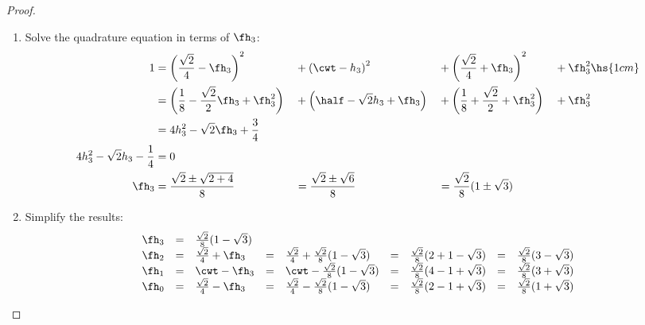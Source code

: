 \begin{proof}
\begin{enumerate}
    \item Solve the quadrature equation in terms of $\fh_3$:
      \begin{align*}
        1
          &=  \left(\frac{\sqrt{2}}{4}-\fh_3\right)^2
          &&+ \left(\cwt-h_3\right)^2
          &&+ \left(\frac{\sqrt{2}}{4}+\fh_3\right)^2
          &&+\fh_3^2 \hs{1cm}
        \\&=  \left(\frac{1}{8}-\frac{\sqrt{2}}{2}\fh_3 + \fh_3^2\right)
          &&+ \left(\half -\sqrt{2}h_3+\fh_3\right)
          &&+ \left(\frac{1}{8} + \frac{\sqrt{2}}{2} + \fh_3^2\right)
          &&+\fh_3^2
        \\&=  4h_3^2 -\sqrt{2}\fh_3 + \frac{3}{4}
      \\
        4h_3^2 -\sqrt{2}h_3 - \frac{1}{4} &=0
      \\
       \fh_3
          &= \frac{\sqrt{2}\pm\sqrt{2+4}}{8}
         &&= \frac{\sqrt{2}\pm\sqrt{6}}{8}
         &&= \frac{\sqrt{2}}{8}(1\pm\sqrt{3})
      \end{align*}

  \item Simplify the results:
  \[\begin{array}{r*{4}{cl}}
   \fh_3 &=& \frac{\sqrt{2}}{8}(1-\sqrt{3})
  \\
   \fh_2 &=& \frac{\sqrt{2}}{4} +\fh_3
        &=& \frac{\sqrt{2}}{4} + \frac{\sqrt{2}}{8}(1-\sqrt{3})
        &=& \frac{\sqrt{2}}{8}(2+1-\sqrt{3})
        &=& \frac{\sqrt{2}}{8}(3-\sqrt{3})
  \\
   \fh_1 &=& \cwt -\fh_3
        &=& \cwt - \frac{\sqrt{2}}{8}(1-\sqrt{3})
        &=& \frac{\sqrt{2}}{8}(4-1+\sqrt{3})
        &=& \frac{\sqrt{2}}{8}(3+\sqrt{3})
  \\
   \fh_0 &=& \frac{\sqrt{2}}{4} -\fh_3
        &=& \frac{\sqrt{2}}{4} - \frac{\sqrt{2}}{8}(1-\sqrt{3})
        &=& \frac{\sqrt{2}}{8}(2-1+\sqrt{3})
        &=& \frac{\sqrt{2}}{8}(1+\sqrt{3})
  \end{array}\]


\end{enumerate}
\end{proof}
